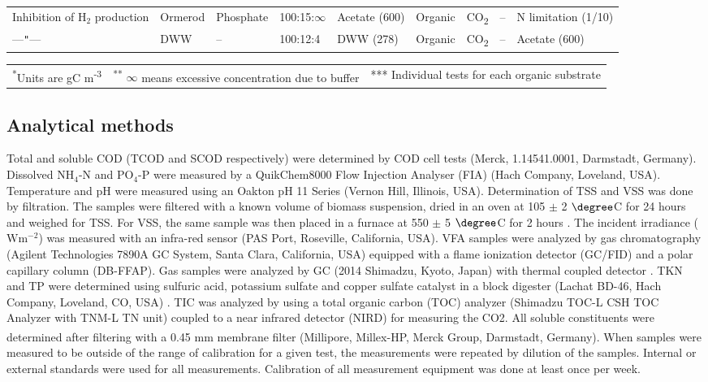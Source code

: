 \begin{table}[tp]
\begin{tabular}{@{}p{3cm} p{1.4cm} p{1.5cm} p{1.7cm} p{1.4cm} p{1.4cm} p{1.4cm} p{1.4cm} p{1.4cm}@{}}
        Inhibition of $\mathrm{H_2}$ production & 
        Ormerod & Phosphate & 100:15:$\infty$&Acetate (600) & Organic & CO\textsubscript{2} & --  & N limitation (1/10) \\
        ---\texttt{"}---& DWW & -- & 100:12:4 &DWW (278) & Organic & CO\textsubscript{2}&-- &Acetate (600) \\
        \bottomrule
    \end{tabular}
    \footnotesize
    \begin{tabular}{@{}p{4cm} p{4cm} p{4cm}}
        \textsuperscript{*}Units are gC m\textsuperscript{-3} & \textsuperscript{**} $\infty$ means excessive concentration due to buffer & *** Individual tests for each organic substrate \\
    \end{tabular}
    \label{tab:batch}
\end{table}

\subsection{Analytical methods}
Total and soluble COD (TCOD and SCOD respectively) were determined by COD cell tests (Merck, 1.14541.0001, Darmstadt, Germany). Dissolved $\mathrm{NH_4\mbox{-}N}$ and $\mathrm{PO_4\mbox{-}P}$ were measured by a QuikChem8000 Flow Injection Analyser (FIA) (Hach Company, Loveland, USA). Temperature and pH were measured using an Oakton pH 11 Series (Vernon Hill, Illinois, USA). Determination of TSS and VSS was done by filtration. The samples were filtered with a known volume of biomass suspension, dried in an oven at 105 $\pm$ 2 $\degree$C for 24 hours and weighed for TSS. For VSS, the same sample was then placed in a furnace at 550 $\pm$ 5 $\degree$C for 2 hours \cite{americanpublichealthassociation1998}. The incident irradiance ($\mathrm{Wm^{-2}}$) was measured with an infra-red sensor (PAS Port\texttrademark, Roseville, California, USA). VFA samples were analyzed by gas chromatography (Agilent Technologies 7890A GC System, Santa Clara, California, USA) equipped with a flame ionization detector (GC/FID) and a polar capillary column (DB-FFAP). Gas samples were analyzed by GC (2014 Shimadzu, Kyoto, Japan) with thermal coupled detector \cite{tait2009}. TKN and TP were determined using sulfuric acid, potassium sulfate and copper sulfate catalyst in a block digester (Lachat BD-46, Hach Company, Loveland, CO, USA) \cite{patton1992}. TIC was analyzed by using a total organic carbon (TOC) analyzer (Shimadzu TOC-L CSH TOC Analyzer with TNM-L TN unit) coupled to a near infrared detector (NIRD) for measuring the CO2. All soluble constituents were determined after filtering with a 0.45 mm membrane filter (Millipore, Millex\textsuperscript{\textregistered}-HP, Merck Group, Darmstadt, Germany). When samples were measured to be outside of the range of calibration for a given test, the measurements were repeated by dilution of the samples. Internal or external standards were used for all measurements. Calibration of all measurement equipment was done at least once per week.


